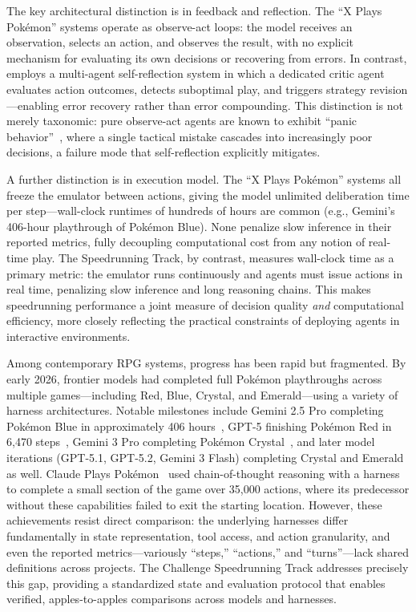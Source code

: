 The key architectural distinction is in feedback and reflection. The ``X Plays Pokémon'' systems operate as observe-act loops: the model receives an observation, selects an action, and observes the result, with no explicit mechanism for evaluating its own decisions or recovering from errors. In contrast, \pokeagent employs a multi-agent self-reflection system in which a dedicated critic agent evaluates action outcomes, detects suboptimal play, and triggers strategy revision---enabling error recovery rather than error compounding. This distinction is not merely taxonomic: pure observe-act agents are known to exhibit ``panic behavior''~\citep{gemini2p5report}, where a single tactical mistake cascades into increasingly poor decisions, a failure mode that self-reflection explicitly mitigates.

A further distinction is in execution model. The ``X Plays Pokémon'' systems all freeze the emulator between actions, giving the model unlimited deliberation time per step---wall-clock runtimes of hundreds of hours are common (e.g., Gemini's 406-hour playthrough of Pokémon Blue). None penalize slow inference in their reported metrics, fully decoupling computational cost from any notion of real-time play. The \pokeagent Speedrunning Track, by contrast, measures wall-clock time as a primary metric: the emulator runs continuously and agents must issue actions in real time, penalizing slow inference and long reasoning chains. This makes speedrunning performance a joint measure of decision quality \emph{and} computational efficiency, more closely reflecting the practical constraints of deploying agents in interactive environments.


Among contemporary RPG systems, progress has been rapid but fragmented.
By early 2026, frontier models had completed full Pokémon playthroughs across multiple games---including Red, Blue, Crystal, and Emerald---using a variety of harness architectures.
Notable milestones include Gemini 2.5 Pro completing Pokémon Blue in approximately 406 hours~\citep{gemini2p5report,zhang2025geminiplayspokemon}, GPT-5 finishing Pokémon Red in 6,470 steps~\citep{engadget2025gptplayspokemon}, Gemini 3 Pro completing Pokémon Crystal~\citep{zhang2025gemini3playspokemon}, and later model iterations (GPT-5.1, GPT-5.2, Gemini 3 Flash) completing Crystal and Emerald as well.
Claude Plays Pokémon~\citep{anthropic2025visible} used chain-of-thought reasoning with a harness to complete a small section of the game over 35,000 actions, where its predecessor without these capabilities failed to exit the starting location.
However, these achievements resist direct comparison: the underlying harnesses differ fundamentally in state representation, tool access, and action granularity, and even the reported metrics---variously ``steps,'' ``actions,'' and ``turns''---lack shared definitions across projects.
The \pokeagent Challenge Speedrunning Track addresses precisely this gap, providing a standardized state and evaluation protocol that enables verified, apples-to-apples comparisons across models and harnesses.

